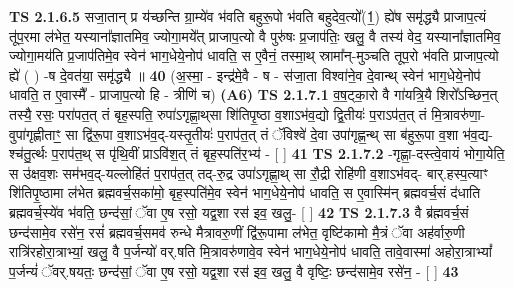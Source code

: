 \documentclass[17pt]{extarticle}
\begin{document}
                  \newline
                                \textbf{ TS 2.1.6.5} \newline
                  सजा॒तान् प्र य॑च्छन्ति ग्रा॒म्ये॑व भ॑वति बहुरू॒पो भ॑वति बहुदेव॒त्यो᳚(1॒) ह्ये॑ष समृ॑द्ध्यै प्राजाप॒त्यं तू॑प॒रमा ल॑भेत॒ यस्याना᳚ज्ञातमिव॒ ज्योगा॒मये᳚त् प्राजाप॒त्यो वै पुरु॑षः प्र॒जाप॑तिः॒ खलु॒ वै तस्य॑ वेद॒ यस्याना᳚ज्ञातमिव॒ ज्योगा॒मय॑ति प्र॒जाप॑तिमे॒व स्वेन॑ भाग॒धेये॒नोप॑ धावति॒ स ए॒वैनं॒ तस्मा॒थ् स्रामा᳚न्-मुञ्चति तूप॒रो भ॑वति प्राजाप॒त्यो ह्ये॑ ( ) -ष दे॒वत॑या॒ समृ॑द्ध्यै ॥ \textbf{  40} \newline
                  \newline
                      (अ॒स्मा॒ - इन्द्र॑मे॒वै - ष - स॑जा॒ता विश्वा॑ने॒व दे॒वान्थ् स्वेन॑ भाग॒धेये॒नोप॑ धावति॒ त ए॒वास्मै᳚ - प्राजाप॒त्यो हि - त्रीणि॑ च) \textbf{(A6)} \newline \newline
                                        \textbf{ TS 2.1.7.1} \newline
                  व॒ष॒ट्का॒रो वै गा॑यत्रि॒यै शिरो᳚ऽच्छिन॒त् तस्यै॒ रसः॒ परा॑पत॒त् तं बृह॒स्पति॒ रुपा॑ऽगृह्णा॒थ्‌सा शि॑तिपृ॒ष्ठा व॒शाऽभ॑व॒द्यो द्वि॒तीयः॑ प॒राऽप॑त॒त् तं मि॒त्रावरु॑णा॒-वुपा॑गृह्णीताꣳ॒॒ सा द्वि॑रू॒पा व॒शाऽभ॑व॒द्-यस्तृ॒तीयः॑ प॒राप॑त॒त् तं ॅविश्वे॑ दे॒वा उपा॑गृह्ण॒न्थ् सा ब॑हुरू॒पा व॒शा भ॑व॒द्य-श्च॑तु॒र्त्थः प॒राप॑त॒थ् स पृ॑थि॒वीं प्राऽवि॑श॒त् तं बृह॒स्पति॑र॒भ्य॑ - [  ] \textbf{  41} \newline
                  \newline
                                \textbf{ TS 2.1.7.2} \newline
                  -गृह्णा॒-दस्त्वे॒वायं भोगा॒येति॒ स उ॑क्षव॒शः सम॑भव॒द्-यल्लोहि॑तं प॒राप॑त॒त् तद्-रु॒द्र उपा॑ऽगृह्णा॒थ् सा रौ॒द्री रोहि॑णी व॒शाऽभ॑वद्- बार्.हस्प॒त्याꣳ शि॑तिपृ॒ष्ठामा ल॑भेत ब्रह्मवर्च॒सका॑मो॒ बृह॒स्पति॑मे॒व स्वेन॑ भाग॒धेये॒नोप॑ धावति॒ स ए॒वास्मि॑न् ब्रह्मवर्च॒सं द॑धाति ब्रह्मवर्च॒स्ये॑व भ॑वति॒ छन्द॑सां॒ ॅवा ए॒ष रसो॒ यद्व॒शा रस॑ इव॒ खलु॒- [  ] \textbf{  42} \newline
                  \newline
                                \textbf{ TS 2.1.7.3} \newline
                  वै ब्र॑ह्मवर्च॒सं छन्द॑सामे॒व रसे॑न॒ रसं॑ ब्रह्मवर्च॒समव॑ रुन्धे मैत्रावरु॒णीं द्वि॑रू॒पामा ल॑भेत॒ वृष्टि॑कामो मै॒त्रं ॅवा अह॑र्वारु॒णी रात्रि॑रहोरा॒त्राभ्यां॒ खलु॒ वै प॒र्जन्यो॑ वर्.षति मि॒त्रावरु॑णावे॒व स्वेन॑ भाग॒धेये॒नोप॑ धावति॒ तावे॒वास्मा॑ अहोरा॒त्राभ्यां᳚ प॒र्जन्यं॑ ॅवर्.षयतः॒ छन्द॑सां॒ ॅवा ए॒ष रसो॒ यद्व॒शा रस॑ इव॒ खलु॒ वै वृष्टिः॒ छन्द॑सामे॒व रसे॑न॒ - [  ] \textbf{  43} \newline
\end{document}
